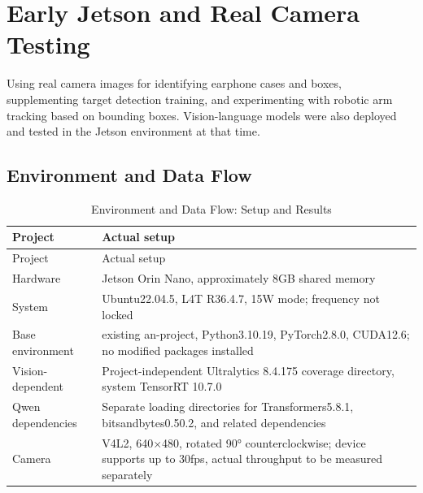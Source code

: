 
\FloatBarrier

\section{Early Jetson and Real Camera Testing}

\label{stage:s06}

Using real camera images for identifying earphone cases and boxes, supplementing target detection training, and experimenting with robotic arm tracking based on bounding boxes. Vision-language models were also deployed and tested in the Jetson environment at that time.

\subsection{Environment and Data Flow}\label{s06-detail-1}

\FloatBarrier\begingroup\small\setlength{\tabcolsep}{2.5pt}
\begin{longtable}[]{@{}
  >{\raggedright\arraybackslash}p{}
  >{\raggedright\arraybackslash}p{}@{}}
\caption{Environment and Data Flow: Setup and Results}\label{tab:s06-1}\tabularnewline
\toprule\noalign{}
\begin{minipage}[b]{\linewidth}\raggedright
Project
\end{minipage} & \begin{minipage}[b]{\linewidth}\raggedright
Actual setup
\end{minipage} \\
\midrule\noalign{}
\endfirsthead
\toprule\noalign{}
\begin{minipage}[b]{\linewidth}\raggedright
Project
\end{minipage} & \begin{minipage}[b]{\linewidth}\raggedright
Actual setup
\end{minipage} \\
\midrule\noalign{}
\endhead
\bottomrule\noalign{}
\endlastfoot
Hardware & Jetson Orin Nano, approximately 8GB shared memory \\
System & Ubuntu22.04.5, L4T R36.4.7, 15W mode; frequency not locked \\
Base environment & existing an-project, Python3.10.19, PyTorch2.8.0, CUDA12.6; no modified packages installed \\
Vision-dependent & Project-independent Ultralytics 8.4.175 coverage directory, system TensorRT 10.7.0 \\
Qwen dependencies & Separate loading directories for Transformers5.8.1, bitsandbytes0.50.2, and related dependencies \\
Camera & V4L2, 640\(\times\)480, rotated 90° counterclockwise; device supports up to 30fps, actual throughput to be measured separately \\
\end{longtable}\endgroup

